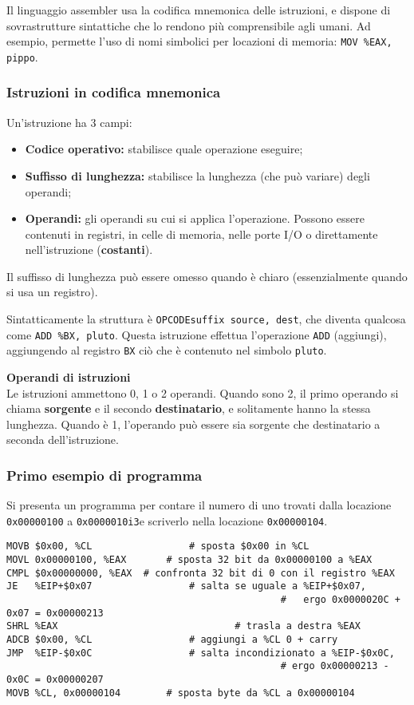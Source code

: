 \documentclass[a4paper,11pt]{article}
\begin{document}
Il linguaggio assembler usa la codifica mnemonica delle istruzioni, e dispone di sovrastrutture sintattiche che lo rendono più comprensibile agli umani.
Ad esempio, permette l'uso di nomi simbolici per locazioni di memoria: \lstinline|MOV %EAX, pippo|.

\subsubsection{Istruzioni in codifica mnemonica}
Un'istruzione ha 3 campi:
\begin{itemize}
	\item \textbf{Codice operativo:} stabilisce quale operazione eseguire;
	\item \textbf{Suffisso di lunghezza:} stabilisce la lunghezza (che può variare) degli operandi;	
	\item \textbf{Operandi:} gli operandi su cui si applica l'operazione. 
		Possono essere contenuti in registri, in celle di memoria, nelle porte I/O o direttamente nell'istruzione (\textbf{costanti}).
\end{itemize}

Il suffisso di lunghezza può essere omesso quando è chiaro (essenzialmente quando si usa un registro).

Sintatticamente la struttura è \lstinline|OPCODEsuffix source, dest|, che diventa qualcosa come \lstinline|ADD %BX, pluto|.
Questa istruzione effettua l'operazione \lstinline|ADD| (aggiungi), aggiungendo al registro \lstinline|BX| ciò che è contenuto nel simbolo \lstinline|pluto|.

\par\medskip
\noindent
\textsf{\textbf{Operandi di istruzioni}} \\
Le istruzioni ammettono 0, 1 o 2 operandi.
Quando sono 2, il primo operando si chiama \textbf{sorgente} e il secondo \textbf{destinatario}, e solitamente hanno la stessa lunghezza.
Quando è 1, l'operando può essere sia sorgente che destinatario a seconda dell'istruzione.

\subsubsection{Primo esempio di programma}

Si presenta un programma per contare il numero di uno trovati dalla locazione \lstinline|0x00000100| a \lstinline|0x0000010i3|e scriverlo nella locazione \lstinline|0x00000104|. 

\begin{lstlisting}[style=codestyle]	
MOVB $0x00, %CL					# sposta $0x00 in %CL
MOVL 0x00000100, %EAX		# sposta 32 bit da 0x00000100 a %EAX
CMPL $0x00000000, %EAX	# confronta 32 bit di 0 con il registro %EAX
JE   %EIP+$0x07					# salta se uguale a %EIP+$0x07, 
												#	ergo 0x0000020C + 0x07 = 0x00000213
SHRL %EAX								# trasla a destra %EAX
ADCB $0x00, %CL					# aggiungi a %CL 0 + carry 
JMP  %EIP-$0x0C					# salta incondizionato a %EIP-$0x0C,
												# ergo 0x00000213 - 0x0C = 0x00000207
MOVB %CL, 0x00000104		# sposta byte da %CL a 0x00000104
\end{lstlisting}
\end{document}
